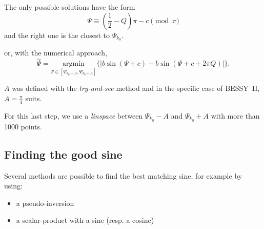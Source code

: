 The only possible solutions have the form
\begin{equation}
 \Psi \equiv \left(\frac{1}{2} - Q\right) \pi - c \pmod \pi
\end{equation}
and the right one is the closest to $\Psi_{k_0}$.


or, with the numerical approach, 
\begin{equation}
\hat{\Psi} =  \underset{\Psi \in [\Psi_{k_0-A}, \Psi_{k_0+A}]}{\textrm{argmin}}\{|b \sin(\Psi + c) - b\sin(\Psi+c+2 \pi Q)|\}.
\end{equation}

$A$ was defined with the \textit{try-and-see} method and in the specific case of BESSY~II, $A=\frac{\pi}{4}$ suits.

\remark For this last step, we use a \textit{linspace} between $\Psi_{k_0}-A$ and $\Psi_{k_0}+A$ with more than 1000 points.

\subsection{Finding the good sine}
Several methods are possible to find the best matching sine, for example by using:
\begin{itemize}
	\item a pseudo-inversion
	\item a scalar-product with a sine (resp. a cosine)
\end{itemize}

